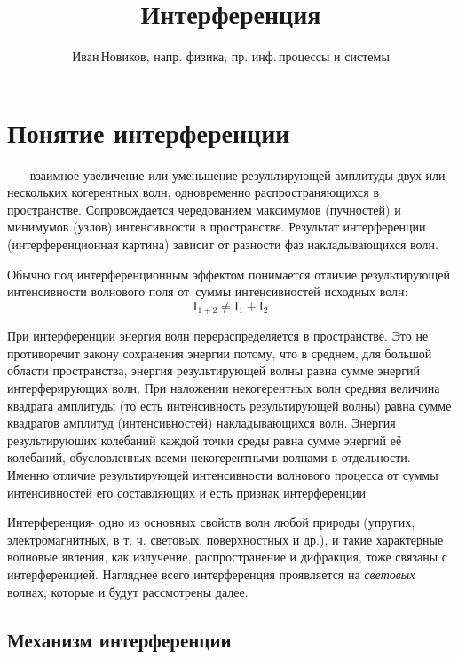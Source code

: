 \documentclass[a4paper, 12pt]{extarticle}
\author{Иван\,Новиков, напр. физика, пр. инф.\,процессы и системы}
\title{Интерференция}
\newcommand{\I}{\mathrm{I}} %
\newcommand{\define}[1]{\uwave{#1}}
\begin{document}
  \maketitle

  \vspace{1.3cm}

  \tableofcontents

  \section{Понятие интерференции}
  \define{Интерференция волн}~--- взаимное увеличение или уменьшение результирующей амплитуды двух
  или нескольких когерентных волн, одновременно распространяющихся в пространстве. Сопровождается
  чередованием максимумов (пучностей) и минимумов (узлов) интенсивности в пространстве. Результат
  интерференции (интерференционная картина) зависит от разности фаз накладывающихся волн.

  Обычно под интерференционным эффектом понимается отличие результирующей интенсивности
  волнового поля от~суммы интенсивностей исходных волн:
  $$ \I_{1+2} \neq \I_1 + \I_2 $$

  При интерференции энергия волн перераспределяется в пространстве. Это не противоречит закону
  сохранения энергии потому, что в среднем, для большой области пространства, энергия результирующей
  волны равна сумме энергий интерферирующих волн. При наложении некогерентных волн средняя
  величина квадрата амплитуды (то есть интенсивность результирующей волны) равна сумме квадратов
  амплитуд (интенсивностей) накладывающихся волн. Энергия результирующих колебаний каждой точки
  среды равна сумме энергий её колебаний, обусловленных всеми некогерентными волнами в отдельности.
  Именно отличие результирующей интенсивности волнового процесса от суммы интенсивностей его
  составляющих и есть признак интерференции

  Интерференция- одно из основных свойств волн любой природы (упругих, электромагнитных, в т. ч.
  световых, поверхностных и др.), и такие характерные волновые явления, как излучение,
  распространение и дифракция, тоже связаны с интерференцией. Нагляднее всего интерференция
  проявляется на \emph{световых} волнах, которые и будут рассмотрены далее.

  \subsection{Механизм интерференции}
\end{document}
